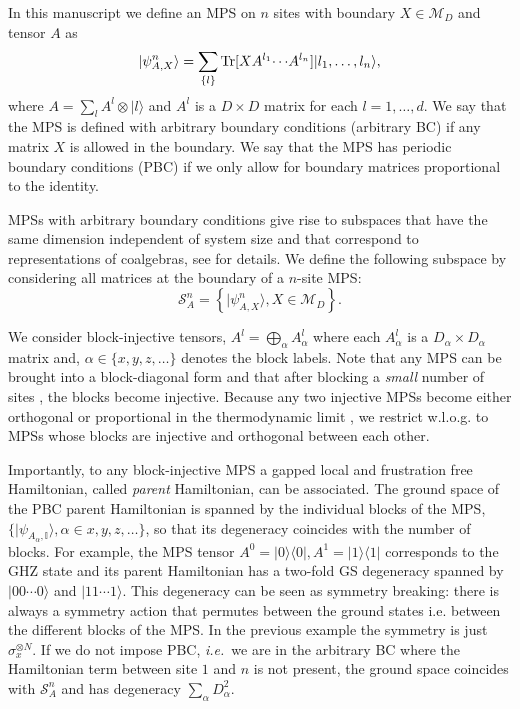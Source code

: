 \documentclass[a4paper,twocolumn,11pt,accepted=2023-02-10]{quantumarticle}
\newcommand{\tr}{{\rm Tr}}
\newcommand{\id}{\mathbb{I}}
\begin{document}
In this manuscript we define an MPS on $n$ sites with boundary $X\in \mathcal{M}_D$ and tensor $A$ as
$$|\psi^n_{A,X}\rangle = \sum_{\{l\}} \tr[XA^{l_1}{\cdots} A^{l_n}]|{l_1}, \dots, {l_n}\rangle,$$
where $A=\sum_l A^l \otimes |l\rangle$ and $A^l$ is a $D\times D$ matrix for each $l=1,\dots,d$. 
We say that the MPS is defined with arbitrary boundary conditions (arbitrary BC) if any matrix $X$ is allowed in the boundary.
We say that the MPS has periodic boundary conditions (PBC) if we only allow for boundary matrices proportional to the identity.

MPSs with arbitrary boundary conditions give rise to subspaces that have the same dimension independent of system size and that correspond to representations of coalgebras, see \cite{molnar22} for details. We define the following subspace by considering all matrices at the boundary of a $n$-site MPS:
\begin{equation}\label{MPSssubs}
\mathcal{S}^n_A= \left\{ |\psi^n_{A,X}\rangle, X\in \mathcal{M}_{D} \right\}.
\end{equation}

We consider block-injective tensors, $A^l = \bigoplus_{\alpha } A^l_\alpha$ where each  $A^l_\alpha$ is a $D_\alpha \times D_\alpha$ matrix and, $\alpha \in \{x,y,z,\dots\}$ denotes the block labels. Note that any MPS can be brought into a block-diagonal form \cite{PerezGarcia07}  and that  after blocking a {\it small} number of sites \cite{Sanz10}, the blocks become injective. Because any two injective MPSs become either orthogonal or proportional in the thermodynamic limit \cite{Cirac17A}, we restrict w.l.o.g. to MPSs whose blocks are injective and orthogonal between each other.

Importantly, to any block-injective MPS a gapped local and frustration free Hamiltonian, called {\it parent} Hamiltonian, can be associated. The ground space of the PBC parent Hamiltonian is spanned by the individual blocks of the MPS, $\{ |\psi_{A_\alpha, \id} \rangle, \alpha \in x, y, z, \dots \}$, so that its degeneracy coincides with the number of blocks. For example, the MPS tensor $A^0=|0\rangle \langle 0|, A^1=|1\rangle \langle 1|$ corresponds to the GHZ state and its parent Hamiltonian has a two-fold GS degeneracy spanned by $|00\cdots 0\rangle$ and $|11\cdots 1\rangle$. This degeneracy can be seen as symmetry breaking: there is always a symmetry action that permutes between the ground states i.e. between the different blocks of the MPS. In the previous example the symmetry is just $\sigma_x^{\otimes N}$. If we do not impose PBC, {\it i.e.}\ we are in the arbitrary BC where the Hamiltonian term between site $1$ and $n$ is not present, the ground space coincides with $\mathcal{S}^n_A$ and has degeneracy $\sum_\alpha D_\alpha^2$. 
\end{document}
